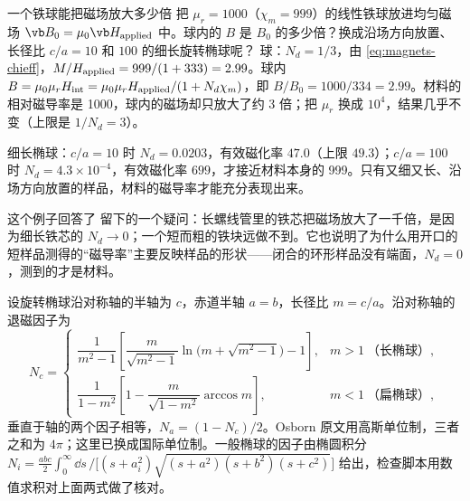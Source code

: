 
\begin{example}[label=ex:magnets-ironsphere]{一个铁球能把磁场放大多少倍}
把 $\mu_r=1000$（$\chi_m=999$）的线性铁球放进均匀磁场 $\vb B_0=\mu_0\vb H_{\rm applied}$ 中。球内的 $B$ 是 $B_0$ 的多少倍？换成沿场方向放置、长径比 $c/a=10$ 和 $100$ 的细长旋转椭球呢？
\solution
球：$N_d=1/3$，由 \eqref{eq:magnets-chieff}，$M/H_{\rm applied}=999/(1+333)=2.99$。球内 $B=\mu_0\mu_rH_{\rm int}=\mu_0\mu_rH_{\rm applied}/(1+N_d\chi_m)$，即 $B/B_0=1000/334=2.99$。材料的相对磁导率是 1000，球内的磁场却只放大了约 3 倍；把 $\mu_r$ 换成 $10^4$，结果几乎不变（上限是 $1/N_d=3$）。

细长椭球：$c/a=10$ 时 $N_d=0.0203$，有效磁化率 $47.0$（上限 $49.3$）；$c/a=100$ 时 $N_d=4.3\times10^{-4}$，有效磁化率 $699$，才接近材料本身的 999。只有又细又长、沿场方向放置的样品，材料的磁导率才能充分表现出来。
\end{example}

这个例子回答了 留下的一个疑问：长螺线管里的铁芯把磁场放大了一千倍，是因为细长铁芯的 $N_d\to0$；一个短而粗的铁块远做不到。它也说明了为什么用开口的短样品测得的“磁导率”主要反映样品的形状——闭合的环形样品没有端面，$N_d=0$，测到的才是材料。

\begin{deeper}
设旋转椭球沿对称轴的半轴为 $c$，赤道半轴 $a=b$，长径比 $m=c/a$。沿对称轴的退磁因子为~\cite{osborn}
\begin{equation*}
N_c=\begin{cases}
\dfrac{1}{m^2-1}\left[\dfrac{m}{\sqrt{m^2-1}}\ln\!\bigl(m+\sqrt{m^2-1}\bigr)-1\right], & m>1\ \text{（长椭球）},\\[3mm]
\dfrac{1}{1-m^2}\left[1-\dfrac{m}{\sqrt{1-m^2}}\arccos m\right], & m<1\ \text{（扁椭球）},
\end{cases}
\end{equation*}
垂直于轴的两个因子相等，$N_a=(1-N_c)/2$。Osborn 原文用高斯单位制，三者之和为 $4\pi$；这里已换成国际单位制。一般椭球的因子由椭圆积分 $N_i=\tfrac{abc}{2}\int_0^\infty\dd s\,/\bigl[(s+a_i^2)\sqrt{(s+a^2)(s+b^2)(s+c^2)}\bigr]$ 给出，检查脚本用数值求积对上面两式做了核对。
\end{deeper}

